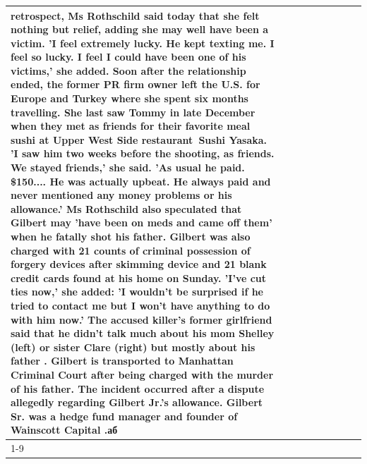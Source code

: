 \begin{table}[H]
\begin{tabular}{lllrlllll}
retrospect, Ms Rothschild said today that she felt nothing but relief, adding she may well have been a victim. 'I feel extremely lucky. He kept texting me. I feel so lucky. I feel I could have been one of his victims,' she added. Soon after the relationship ended, the former PR firm owner left the U.S. for Europe and Turkey where she spent six months  travelling. She last saw Tommy in late December when they met as friends for their favorite meal sushi at Upper West Side restaurant Sushi Yasaka. 'I saw him two weeks before the shooting, as friends. We stayed friends,' she said. 'As usual he paid. \$150.... He was actually upbeat. He always paid and never mentioned any money problems or his allowance.' Ms Rothschild also speculated that Gilbert may 'have been on meds and came off them' when he fatally shot his father. Gilbert was also charged with 21 counts of criminal possession of forgery devices after skimming device and 21 blank credit cards found at his home on Sunday. 'I've cut ties now,' she added: 'I wouldn’t be surprised if he tried to contact me but I won’t have anything to do with him now.' The accused killer's former girlfriend said that he didn't talk much about his mom Shelley (left) or sister Clare (right) but mostly about his father . Gilbert is transported to Manhattan Criminal Court  after being charged with the murder of his father. The incident occurred after a dispute allegedly regarding Gilbert Jr.'s allowance. Gilbert Sr. was a hedge fund manager and founder of Wainscott Capital .аб \\
\cline{1-9}

\end{tabular}
\end{table}
